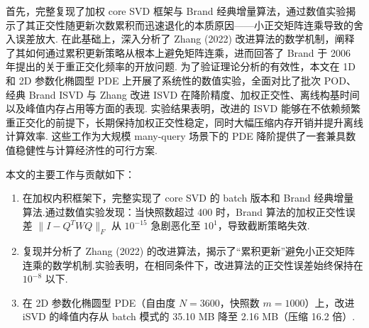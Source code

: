 首先，完整复现了加权 core SVD 框架与 Brand 经典增量算法，通过数值实验揭示了其正交性随更新次数累积而迅速退化的本质原因——小正交矩阵连乘导致的舍入误差放大.
在此基础上，深入分析了 Zhang (2022) 改进算法的数学机制，阐释了其如何通过累积更新策略从根本上避免矩阵连乘，进而回答了 Brand 于 2006 年提出的关于重正交化频率的开放问题.
为了验证理论分析的有效性，本文在 1D 和 2D 参数化椭圆型 PDE 上开展了系统性的数值实验，全面对比了批次 POD、经典 Brand ISVD 与 Zhang 改进 ISVD 在降阶精度、加权正交性、离线构基时间以及峰值内存占用等方面的表现.
实验结果表明，改进的 ISVD 能够在不依赖频繁重正交化的前提下，长期保持加权正交性稳定，同时大幅压缩内存开销并提升离线计算效率.
这些工作为大规模 many-query 场景下的 PDE 降阶提供了一套兼具数值稳健性与计算经济性的可行方案.

本文的主要工作与贡献如下：
\begin{enumerate}
    \item 在加权内积框架下，完整实现了 core SVD 的 batch 版本和 Brand 经典增量算法.通过数值实验发现：当快照数超过 400 时，Brand 算法的加权正交性误差 \( \|I - Q^T WQ\|_F \) 从 \( 10^{-15} \) 急剧恶化至 \( 10^1 \)，导致截断策略失效.
    \item 复现并分析了 Zhang (2022) 的改进算法，揭示了“累积更新”避免小正交矩阵连乘的数学机制.实验表明，在相同条件下，改进算法的正交性误差始终保持在 \( 10^{-8} \) 以下.
    \item 在 2D 参数化椭圆型 PDE（自由度 \( N = 3600 \)，快照数 \( m = 1000 \)）上，改进 iSVD 的峰值内存从 batch 模式的 35.10 MB 降至 2.16 MB（压缩 16.2 倍）.
\end{enumerate}